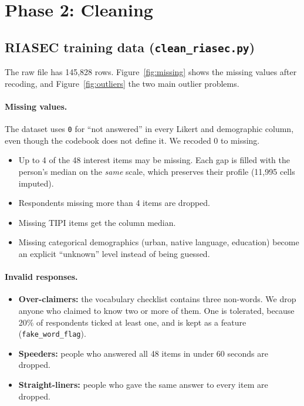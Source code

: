 \documentclass[11pt,a4paper]{article}
\begin{document}
\section{Phase 2: Cleaning}

\subsection{RIASEC training data (\texttt{clean\_riasec.py})}
The raw file has 145,828 rows. Figure~\ref{fig:missing} shows the missing values after recoding,
and Figure~\ref{fig:outliers} the two main outlier problems.

\paragraph{Missing values.} The dataset uses \texttt{0} for ``not answered'' in every Likert and
demographic column, even though the codebook does not define it. We recoded 0 to missing.
\begin{itemize}
\item Up to 4 of the 48 interest items may be missing. Each gap is filled with the person's median
      on the \emph{same} scale, which preserves their profile (11,995 cells imputed).
\item Respondents missing more than 4 items are dropped.
\item Missing TIPI items get the column median.
\item Missing categorical demographics (urban, native language, education) become an explicit
      ``unknown'' level instead of being guessed.
\end{itemize}

\paragraph{Invalid responses.}
\begin{itemize}
\item \textbf{Over-claimers:} the vocabulary checklist contains three non-words. We drop anyone
      who claimed to know two or more of them. One is tolerated, because 20\% of respondents ticked
      at least one, and is kept as a feature (\texttt{fake\_word\_flag}).
\item \textbf{Speeders:} people who answered all 48 items in under 60 seconds are dropped.
\item \textbf{Straight-liners:} people who gave the same answer to every item are dropped.
\end{itemize}
\end{document}
